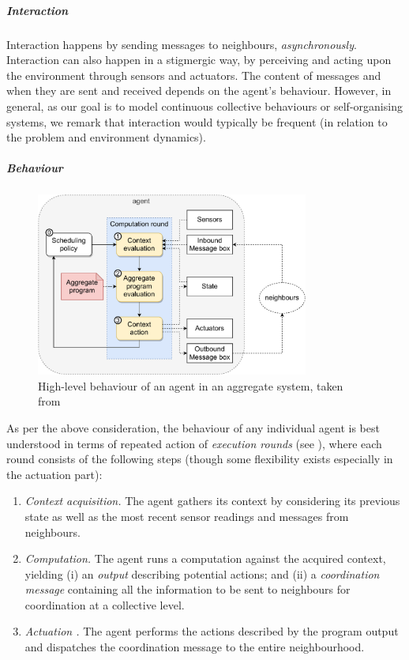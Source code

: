 \subparagraph*{Interaction}
%
Interaction happens by sending messages
 to neighbours, \emph{asynchronously}.
%
Interaction can also happen in a stigmergic way, 
 by perceiving and acting upon the environment through sensors and actuators.
%
The content of messages and when they are sent and received depends on the agent's behaviour.
%
However, in general, as our goal is to model continuous collective behaviours or self-organising systems,
 we remark that interaction would typically be frequent (in relation to the problem and environment dynamics).

\subparagraph{Behaviour}
\begin{figure}
    \centering
    \includegraphics[width=0.8\textwidth]{chapters/img/aggregate-agent-control-architecture.pdf}
    \caption[High-level behaviour of an agent in an aggregate system]{High-level behaviour of an agent in an aggregate system, taken from~\cite{casadei2021programming}}\label{fig:aggregate-agent-control-architecture}
\end{figure}
%
As per the above consideration,
 the behaviour of any individual agent is best understood
 in terms of repeated action of \emph{execution rounds} (see ), where each round consists of the following steps (though some flexibility exists especially in the actuation part):
%
\begin{enumerate}
\item \emph{Context acquisition.} The agent gathers its context by considering its previous state as well as the most recent sensor readings and messages from neighbours.
\item \emph{Computation.} The agent runs a computation against the acquired context, 
 yielding (i) an \emph{output} describing potential actions; 
 and (ii) a \emph{coordination message} containing all the information to be sent to neighbours for coordination at a collective level.
\item \emph{Actuation .} The agent performs the actions described by the program output and dispatches the coordination message to the entire neighbourhood.
\end{enumerate}
%

